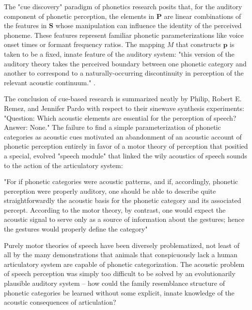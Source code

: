 \begin{multicols}{2}
The "cue discovery" paradigm of phonetics research posits that, for the auditory component of phonetic perception, the elements in $\mathbf{P}$ are linear combinations of the features in $\mathbf{S}$ whose manipulation can influence the identity of the perceived phoneme. These features represent familiar phonetic parameterizations like voice onset times or formant frequency ratios. The mapping $M$ that constructs $\mathbf{p}$ is taken to be a fixed, innate feature of the auditory system: "this version of the auditory theory takes the perceived boundary between one phonetic category and another to correspond to a naturally-occurring discontinuity in perception of the relevant acoustic continuum." \cite{Liberman1985a}. 

The conclusion of cue-based research is summarized neatly by Philip, Robert E. Remez, and Jennifer Pardo with respect to their sinewave synthesis experiments: "Question: Which acoustic elements are essential for the perception of speech? Answer: None\cite{HaskinsLaboratories2020}." The failure to find a simple parameterization of phonetic categories as acoustic cues motivated an abandonment of an acoustic account of phonetic perception entirely in favor of a motor theory of perception that positied a special, evolved "speech module" that linked the wily acoustics of speech sounds to the action of the articulatory system:

\begin{leftbar}
"For if phonetic categories were acoustic patterns, and if, accordingly, phonetic perception were properly auditory, one should be able to describe quite straightforwardly the acoustic basis for the phonetic category and its associated percept. According to the motor theory, by contrast, one would expect the acoustic signal to serve only as a source of information about the gestures; hence the gestures would properly define the category"
\cite{Liberman1985a}
\end{leftbar}

Purely motor theories of speech have been diversely problematized, not least of all by the many demonstrations that animals that conspicuously lack a human articulatory system are capable of phonetic categorization\cite{Carbonell2014,Lotto1997,Kluender2000}. The acoustic problem of speech perception was simply too difficult to be solved by an evolutionarily plausible auditory system -- how could the family resemblance structure of phonetic categories be learned without some explicit, innate knowledge of the acoustic consequences of articulation?\cite{Bailey1980} 


\end{multicols}
